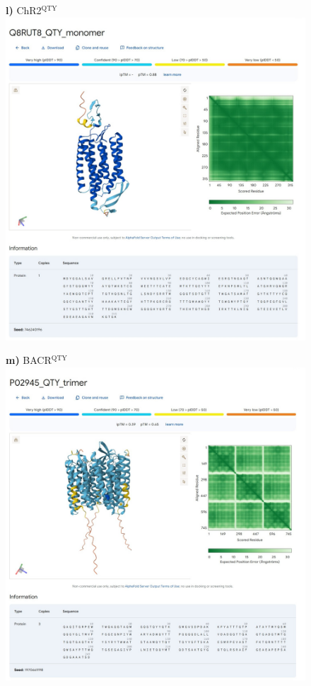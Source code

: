\documentclass[fleqn,12pt]{supp}
\begin{document}
\newpage
\begin{figure}[H]
    \textbf{l)} ChR2$^{\textrm{QTY}}$ \\
    \includegraphics[width=\linewidth]{SuppFigures/af3 chr2 qty mono.jpg}
\end{figure}

\newpage
\begin{figure}[H]
    \textbf{m)} BACR$^{\textrm{QTY}}$ \\
    \includegraphics[width=\linewidth]{SuppFigures/af3 bacr qty tri.jpg}
\end{figure}
\end{document}
